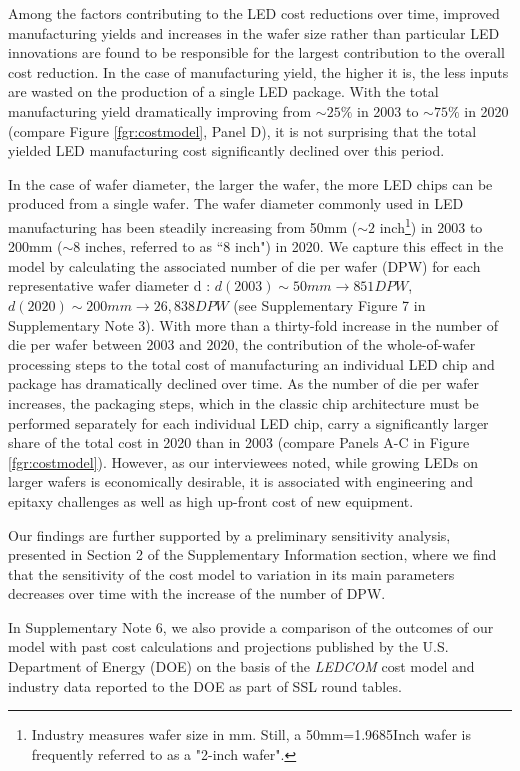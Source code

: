 \documentclass[parskip=full]{article}
\begin{document}
Among the factors contributing to the LED cost reductions over time, improved manufacturing yields and increases in the wafer size rather than particular LED innovations are found to be responsible for the largest contribution to the overall cost reduction. In the case of manufacturing yield, the higher it is, the less inputs are wasted on the production of a single LED package. With the total manufacturing yield dramatically improving from $\sim25\%$ in 2003 to $\sim75\%$ in 2020 (compare Figure \ref{fgr:costmodel}, Panel D), it is not surprising that the total yielded LED manufacturing cost significantly declined over this period.

In the case of wafer diameter, the larger the wafer, the more LED chips can be produced from a single wafer. The wafer diameter commonly used in LED manufacturing has been steadily increasing from 50mm ($\sim2$ inch\footnote{Industry measures wafer size in mm. Still, a 50mm=1.9685Inch wafer is frequently referred to as a "2-inch wafer".}) in 2003 to 200mm ($\sim$8 inches, referred to as “8 inch") in 2020. We capture this effect in the model by calculating the associated number of die per wafer (DPW) for each representative wafer diameter d \cite{de2005investigation}: $d(2003)\sim 50 mm \rightarrow851 DPW$, $d(2020)\sim200 mm \rightarrow 26,838 DPW$ (see Supplementary Figure 7 in Supplementary Note 3). With more than a thirty-fold increase in the number of die per wafer between 2003 and 2020, the contribution of the whole-of-wafer processing steps to the total cost of manufacturing an individual LED chip and package has dramatically declined over time. As the number of die per wafer increases, the packaging steps, which in the classic chip architecture must be performed separately for each individual LED chip, carry a significantly larger share of the total cost in 2020 than in 2003 (compare Panels A-C in Figure \ref{fgr:costmodel}). However, as our interviewees noted, while growing LEDs on larger wafers is economically desirable, it is associated with engineering and epitaxy challenges as well as high up-front cost of new equipment.

Our findings are further supported by a preliminary sensitivity analysis, presented in Section 2 of the Supplementary Information section, where we find that the sensitivity of the cost model to variation in its main parameters decreases over time with the increase of the number of DPW. 

In Supplementary Note 6, we also provide a comparison of the outcomes of our model with past cost calculations and projections published by the U.S. Department of Energy (DOE) on the basis of the \textit{LEDCOM} cost model \cite{ledcomv2} and industry data reported to the DOE as part of SSL round tables.
\end{document}
